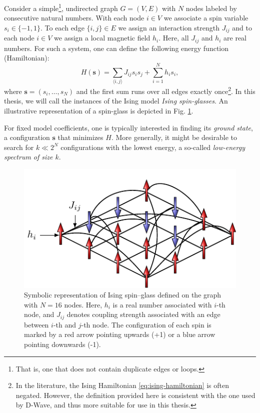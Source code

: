 Consider a simple\footnote{That is, one that does not contain duplicate edges
  or loops.}, undirected graph $G = (V, E)$ with $N$ nodes labeled by consecutive
natural numbers. With each node $i \in V$ we associate a spin variable $s_i \in
  \{-1, 1\}$. To each edge $\{i, j\} \in E$ we assign an interaction strength
$J_{ij}$ and to each node $i \in V$ we assign a local magnetic field $h_i$.
Here, all $J_{ij}$ and $h_i$ are real numbers. For such a system, one can
define the following energy function (Hamiltonian):
\begin{equation}
  \label{eq:ising-hamiltonian}
  H(\mathbf{s}) = \sum_{\langle i, j \rangle} J_{ij} s_i s_j +  \sum_{i=1}^N h_i s_i,
\end{equation}
where $\mathbf{s} = (s_i, \ldots, s_N)$ and the first sum runs over all edges
exactly once\footnote{ In the literature, the Ising Hamiltonian
  \eqref{eq:ising-hamiltonian} is often negated. However, the definition provided
  here is consistent with the one used by D-Wave, and thus more suitable for use
  in this thesis.}. In this thesis, we will call the instances of the Ising model
\emph{Ising spin-glasses}. An illustrative representation of a spin-glass is depicted in
Fig. \ref{fig:ising}.


For fixed model coefficients, one is typically interested in finding its
\emph{ground state}, a configuration $\mathbf{s}$ that minimizes $H$. More
generally, it might be desirable to search for $k \ll 2^N$ configurations with
the lowest energy, a so-called \emph{low-energy spectrum of size $k$}.

\begin{figure}[H]
  \centering
  \includegraphics{figures/spins.pdf}
  \caption{Symbolic representation of Ising spin--glass defined on the graph with $N=16$
    nodes. Here, $h_i$ is a real number associated with $i$-th node, and $J_{ij}$
    denotes coupling strength associated with an edge between $i$-th and $j$-th
    node. The configuration of each spin is marked by a red arrow pointing upwards
    (+1) or a blue arrow pointing downwards (-1).} \label{fig:my_label}
  \label{fig:ising}
\end{figure}

